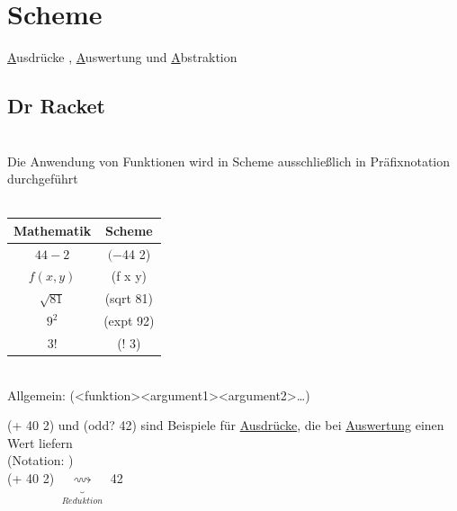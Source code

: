 \section*{Scheme}
\underline{A}usdr\"ucke , \underline{A}uswertung und \underline{A}bstraktion\\
\subsection*{Dr Racket}
\\
Die Anwendung von Funktionen wird in Scheme ausschlie\ss lich in Pr\"afixnotation durchgef\"uhrt\\
\linie\\
\begin{center}
\begin{tabular}{c|c}
Mathematik & Scheme \\
\hline
$44-2$ & $(- $44 2)\\
$f(x,y)$ & (f x y)\\
$\sqrt{81}$ & (sqrt 81)\\
$9^2$ & (expt 92)\\
$3!$ & (! 3)\\
\end{tabular}\\
Allgemein: (\textless funktion\textgreater \textless argument1\textgreater \textless argument2\textgreater \ldots)
\end{center}
(+ 40 2) und (odd? 42) sind Beispiele f\"ur \underline{Ausdr\"ucke}, die bei \underline{Auswertung} einen Wert liefern\\
(Notation: \eval)\\
(+ 40 2) $\underbrace{\longrightsquigarrow}_{Reduktion}$ 42\\
